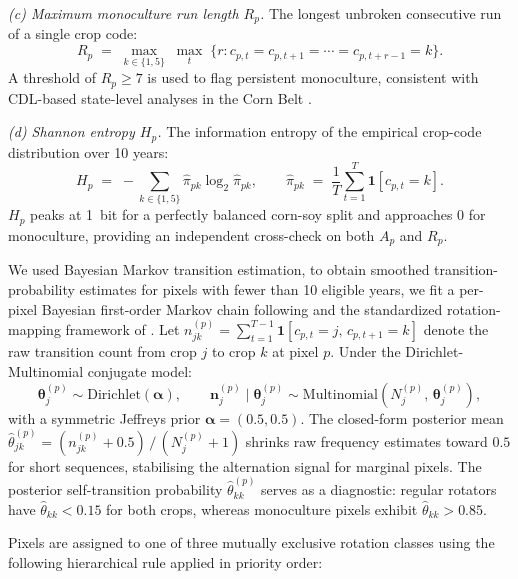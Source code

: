 \documentclass{article}
\begin{document}
\emph{(c) Maximum monoculture run length $R_p$.}
The longest unbroken consecutive run of a single crop code:
\begin{equation}
    R_p \;=\; \max_{k \in \{1,5\}}\;\max_{t}\;
    \{r : c_{p,t}=c_{p,t+1}=\cdots=c_{p,t+r-1}=k\}.
    \label{eq:run_length}
\end{equation}
A threshold of $R_p \geq 7$ is used to flag persistent monoculture, consistent
with CDL-based state-level analyses in the Corn Belt \citep{stern2012iowa}.

\emph{(d) Shannon entropy $H_p$.}
The information entropy of the empirical crop-code distribution over 10 years:
\begin{equation}
    H_p \;=\; -\sum_{k \in \{1,5\}} \hat{\pi}_{pk}\log_2\hat{\pi}_{pk},
    \qquad
    \hat{\pi}_{pk} \;=\; \frac{1}{T}\sum_{t=1}^{T}\mathbf{1}[c_{p,t}=k].
    \label{eq:entropy}
\end{equation}
$H_p$ peaks at 1~bit for a perfectly balanced corn-soy split and approaches 0
for monoculture, providing an independent cross-check on both $A_p$ and $R_p$.

We used Bayesian Markov transition estimation, to obtain smoothed transition-probability estimates for pixels with fewer than
10 eligible years, we fit a per-pixel Bayesian first-order Markov chain following
\citet{welton2005} and the standardized rotation-mapping framework of
\citet{nandan2026rotation}.
Let $n_{jk}^{(p)} = \sum_{t=1}^{T-1}\mathbf{1}[c_{p,t}=j,\,c_{p,t+1}=k]$
denote the raw transition count from crop $j$ to crop $k$ at pixel $p$.
Under the Dirichlet-Multinomial conjugate model:
\begin{equation}
    \boldsymbol{\theta}^{(p)}_j \sim \mathrm{Dirichlet}(\boldsymbol{\alpha}),
    \qquad
    \mathbf{n}^{(p)}_j \mid \boldsymbol{\theta}^{(p)}_j
    \sim \mathrm{Multinomial}\!\left(N_j^{(p)},\,\boldsymbol{\theta}^{(p)}_j\right),
    \label{eq:markov_bayes}
\end{equation}
with a symmetric Jeffreys prior $\boldsymbol{\alpha} = (0.5,0.5)$.
The closed-form posterior mean
$\hat{\theta}^{(p)}_{jk} = (n_{jk}^{(p)} + 0.5)\,/\,(N_j^{(p)} + 1)$
shrinks raw frequency estimates toward $0.5$ for short sequences,
stabilising the alternation signal for marginal pixels.
The posterior self-transition probability $\hat{\theta}^{(p)}_{kk}$ serves as a
diagnostic: regular rotators have $\hat{\theta}_{kk}<0.15$ for both crops,
whereas monoculture pixels exhibit $\hat{\theta}_{kk}>0.85$.

Pixels are assigned to one of three mutually exclusive rotation classes using the
following hierarchical rule applied in priority order:
\end{document}

